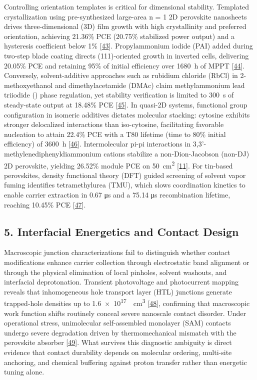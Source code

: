 \documentclass[
  11pt,
]{article}
\begin{document}
Controlling orientation templates is critical for dimensional stability.
Templated crystallization using pre-synthesized large-area n = 1 2D
perovskite nanosheets drives three-dimensional (3D) film growth with
high crystallinity and preferred orientation, achieving 21.36\% PCE
(20.75\% stabilized power output) and a hysteresis coefficient below 1\%
{[}\href{https://doi.org/10.1002/smll.74076}{43}{]}. Propylammonium
iodide (PAI) added during two-step blade coating directs (111)-oriented
growth in inverted cells, delivering 20.05\% PCE and retaining 95\% of
initial efficiency over \qty{1680}{\hour} of MPPT
{[}\href{https://doi.org/10.1002/solr.70385}{44}{]}. Conversely,
solvent-additive approaches such as rubidium chloride (RbCl) in
2-methoxyethanol and dimethylacetamide (DMAc) claim methylammonium lead
triiodide () phase regulation, yet stability verification is
limited to \qty{300}{\second} of steady-state output at 18.48\% PCE
{[}\href{https://doi.org/10.1002/solr.70363}{45}{]}. In quasi-2D
systems, functional group configuration in isomeric additives dictates
molecular stacking: cytosine exhibits stronger delocalized interactions
than iso-cytosine, facilitating favorable nucleation to attain 22.4\%
PCE with a T80 lifetime (time to 80\% initial efficiency) of
\qty{3600}{\hour}
{[}\href{https://doi.org/10.1021/acs.jpclett.6c01531}{46}{]}.
Intermolecular pi-pi interactions in 3,3'-methylenediphenyldiammonium
cations stabilize a non-Dion-Jacobson (non-DJ) 2D perovskite, yielding
26.52\% module PCE on \qty{50}{\centi\meter\squared}
{[}\href{https://doi.org/10.1002/anie.2974414}{11}{]}. For tin-based
perovskites, density functional theory (DFT) guided screening of solvent
vapor fuming identifies tetramethylurea (TMU), which slows coordination
kinetics to enable carrier extraction in 0.67 μs and a 75.14 μs
recombination lifetime, reaching 10.45\% PCE
{[}\href{https://doi.org/10.1021/acsenergylett.6c01505}{47}{]}.

\subsection{5. Interfacial Energetics and Contact
Design}\label{interfacial-energetics-and-contact-design}

Macroscopic junction characterizations fail to distinguish whether
contact modifications enhance carrier collection through electrostatic
band alignment or through the physical elimination of local pinholes,
solvent washouts, and interfacial deprotonation. Transient photovoltage
and photocurrent mapping reveals that inhomogeneous hole transport layer
(HTL) junctions generate trapped-hole densities up to
\qty{1.6e17}{\per\centi\meter\cubed}
{[}\href{https://doi.org/10.1021/acsaem.6c00612}{48}{]}, confirming that
macroscopic work function shifts routinely conceal severe nanoscale
contact disorder. Under operational stress, unimolecular self-assembled
monolayer (SAM) contacts undergo severe degradation driven by
thermomechanical mismatch with the perovskite absorber
{[}\href{https://doi.org/10.1038/s44172-026-00695-4}{49}{]}. What
survives this diagnostic ambiguity is direct evidence that contact
durability depends on molecular ordering, multi-site anchoring, and
chemical buffering against proton transfer rather than energetic tuning
alone.
\end{document}
